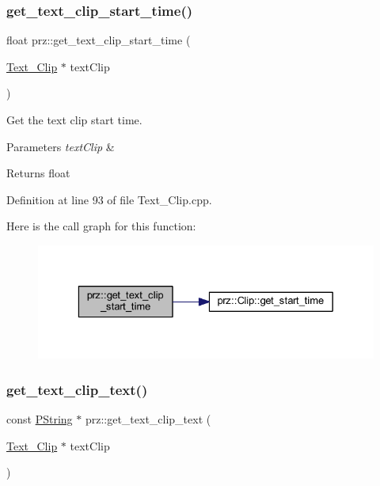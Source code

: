 \subsubsection{\texorpdfstring{get\_text\_clip\_start\_time()}{get\_text\_clip\_start\_time()}}
{\footnotesize\ttfamily float prz\+::get\+\_\+text\+\_\+clip\+\_\+start\+\_\+time (\begin{DoxyParamCaption}\item[{\mbox{\hyperlink{classprz_1_1_text___clip}{Text\+\_\+\+Clip}} $\ast$}]{text\+Clip }\end{DoxyParamCaption})}



Get the text clip start time. 


\begin{DoxyParams}{Parameters}
{\em text\+Clip} & \\
\hline
\end{DoxyParams}
\begin{DoxyReturn}{Returns}
float 
\end{DoxyReturn}


Definition at line 93 of file Text\+\_\+\+Clip.\+cpp.

Here is the call graph for this function\+:
\nopagebreak
\begin{figure}[H]
\begin{center}
\leavevmode
\includegraphics[width=329pt]{namespaceprz_a616eb57f615a3c7b942e33139a30b25a_cgraph}
\end{center}
\end{figure}
\mbox{\label{namespaceprz_a007de1ffd5893fd30640a9117d09245a}} 
\subsubsection{\texorpdfstring{get\_text\_clip\_text()}{get\_text\_clip\_text()}}
{\footnotesize\ttfamily const \mbox{\hyperlink{classprz_1_1_p_string}{P\+String}} $\ast$ prz\+::get\+\_\+text\+\_\+clip\+\_\+text (\begin{DoxyParamCaption}\item[{\mbox{\hyperlink{classprz_1_1_text___clip}{Text\+\_\+\+Clip}} $\ast$}]{text\+Clip }\end{DoxyParamCaption})}



